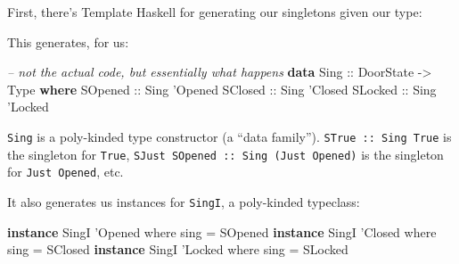\documentclass[]{article}
\newenvironment{Shaded}{}{}
\newcommand{\KeywordTok}[1]{\textcolor[rgb]{0.00,0.44,0.13}{\textbf{#1}}}
\newcommand{\DataTypeTok}[1]{\textcolor[rgb]{0.56,0.13,0.00}{#1}}
\newcommand{\CharTok}[1]{\textcolor[rgb]{0.25,0.44,0.63}{#1}}
\newcommand{\CommentTok}[1]{\textcolor[rgb]{0.38,0.63,0.69}{\textit{#1}}}
\newcommand{\OtherTok}[1]{\textcolor[rgb]{0.00,0.44,0.13}{#1}}
\newcommand{\FunctionTok}[1]{\textcolor[rgb]{0.02,0.16,0.49}{#1}}
\newcommand{\NormalTok}[1]{#1}
\begin{document}
First, there's Template Haskell for generating our singletons given our type:

\begin{Shaded}
\end{Shaded}

This generates, for us:

\begin{Shaded}
\begin{Highlighting}[]
\CommentTok{-- not the actual code, but essentially what happens}
\KeywordTok{data} \DataTypeTok{Sing}\OtherTok{ ::} \DataTypeTok{DoorState} \OtherTok{->} \DataTypeTok{Type} \KeywordTok{where}
    \DataTypeTok{SOpened}\OtherTok{ ::} \DataTypeTok{Sing} \CharTok{'Opened}
    \DataTypeTok{SClosed}\OtherTok{ ::} \DataTypeTok{Sing} \CharTok{'Closed}
    \DataTypeTok{SLocked}\OtherTok{ ::} \DataTypeTok{Sing} \CharTok{'Locked}
\end{Highlighting}
\end{Shaded}

\texttt{Sing} is a poly-kinded type constructor (a ``data family'').
\texttt{STrue\ ::\ Sing\ \textquotesingle{}True} is the singleton for
\texttt{\textquotesingle{}True},
\texttt{SJust\ SOpened\ ::\ Sing\ (\textquotesingle{}Just\ \textquotesingle{}Opened)}
is the singleton for \texttt{\textquotesingle{}Just\ \textquotesingle{}Opened},
etc.

It also generates us instances for \texttt{SingI}, a poly-kinded typeclass:

\begin{Shaded}
\begin{Highlighting}[]
\KeywordTok{instance} \DataTypeTok{SingI} \CharTok{'Opened where}
\NormalTok{    sing }\FunctionTok{=} \DataTypeTok{SOpened}
\KeywordTok{instance} \DataTypeTok{SingI} \CharTok{'Closed where}
\NormalTok{    sing }\FunctionTok{=} \DataTypeTok{SClosed}
\KeywordTok{instance} \DataTypeTok{SingI} \CharTok{'Locked where}
\NormalTok{    sing }\FunctionTok{=} \DataTypeTok{SLocked}
\end{Highlighting}
\end{Shaded}
\end{document}
